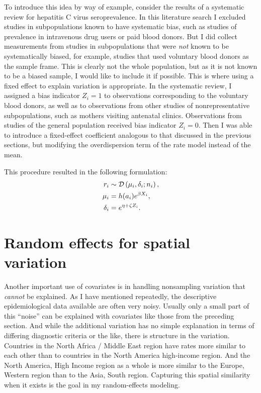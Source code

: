 To introduce this idea by way of example, consider the results of a
systematic review for hepatitis C virus seroprevalence.  In this
literature search I excluded studies in subpopulations known to have
systematic bias, such as studies of prevalence in intravenous drug
users or paid blood donors.  But I did collect measurements from
studies in subpopulations that were \emph{not} known to be
systematically biased, for example, studies that used voluntary blood
donors as the sample frame.  This is clearly not the whole population,
but as it is not known to be a biased sample, I would like to include
it if possible.  This is where using a fixed effect to explain
variation is appropriate. In the systematic review, I assigned
a bias indicator $Z_i = 1$ to observations corresponding to
the voluntary blood donors, as well as to observations from other studies of nonrepresentative
subpopulations, such as mothers visiting antenatal clinics.
Observations from studies of the general
population received bias indicator $Z_i = 0$.  Then I was able to
introduce a fixed-effect coefficient analogous to that discussed in the previous sections,
but modifying the overdispersion term of the rate model instead of
the mean.

This procedure resulted in the following
formulation:
\begin{align*}
r_i &\sim \mathcal{D}\left(\mu_i, \delta_i; n_i\right),\\
\mu_i &= h(a_i)e^{\beta X_i},\\
\delta_i &= e^{\eta + \zeta Z_i}.
\end{align*}

\section{Random effects for spatial variation}
Another important use of covariates is in handling nonsampling
variation that \emph{cannot} be explained. As I have mentioned
repeatedly, the descriptive epidemiological data available are often
very noisy.  Usually only a small part of this ``noise''
can be explained with covariates like those from the preceding
section. And while the additional variation has no simple explanation
in terms of differing diagnostic criteria or the like, there is
structure in the variation. Countries in the North Africa / Middle East
region have rates more similar to each other than to countries in the
North America high-income region.  And the North America, High Income
region as a whole is more similar to the Europe, Western region than
to the Asia, South region.  Capturing this spatial similarity when it
exists is the goal in my random-effects modeling.

